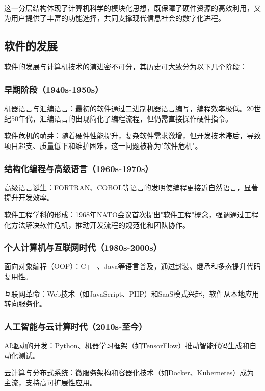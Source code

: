 这一分层结构体现了计算机科学的模块化思想，既保障了硬件资源的高效利用，又为用户提供了丰富的功能选择，共同支撑现代信息社会的数字化进程。

\subsection{软件的发展}

软件的发展与计算机技术的演进密不可分，其历史可大致分为以下几个阶段：

\subsubsection{早期阶段（1940s-1950s）}

机器语言与汇编语言：最初的软件通过二进制机器语言编写，编程效率极低。20世纪50年代，汇编语言的出现简化了编程流程，但仍需直接操作硬件指令。

软件危机的萌芽：随着硬件性能提升，复杂软件需求激增，但开发技术滞后，导致项目超支、质量低下和维护困难，这一问题被称为"软件危机"。

\subsubsection{结构化编程与高级语言（1960s-1970s）}

高级语言诞生：FORTRAN、COBOL等语言的发明使编程更接近自然语言，显著提升开发效率。

软件工程学科的形成：1968年NATO会议首次提出"软件工程"概念，强调通过工程化方法解决软件危机，推动开发流程的规范化和团队协作。

\subsubsection{个人计算机与互联网时代（1980s-2000s）}

面向对象编程（OOP）：C++、Java等语言普及，通过封装、继承和多态提升代码复用性。

互联网革命：Web技术（如JavaScript、PHP）和SaaS模式兴起，软件从本地应用转向服务化。

\subsubsection{人工智能与云计算时代（2010s-至今）}

AI驱动的开发：Python、机器学习框架（如TensorFlow）推动智能代码生成和自动化测试。

云计算与分布式系统：微服务架构和容器化技术（如Docker、Kubernetes）成为主流，支持高可扩展性应用。

